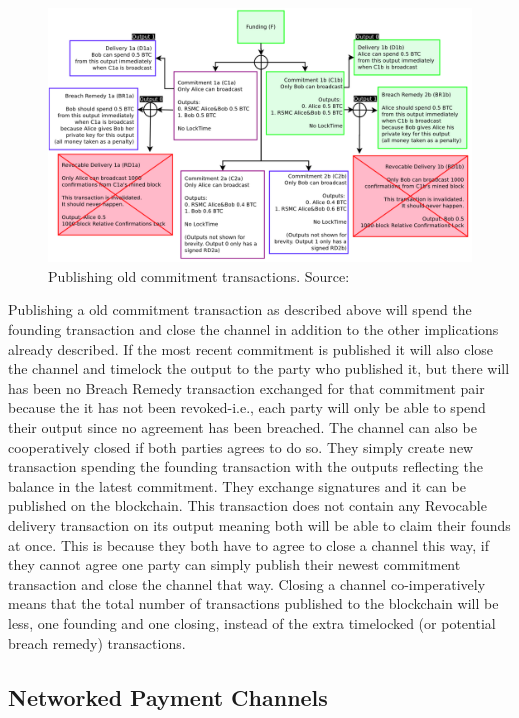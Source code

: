 \begin{figure}[h]
    \centering
    \includegraphics[width=14cm]{figures/ln_breach.png}
    \caption{Publishing old commitment transactions. Source: \cite{poon2015bitcoin}}
    \label{fig:ln_breach}
\end{figure}

Publishing a old commitment transaction as described above will spend the founding transaction and close the channel in addition to the other implications already described. If the most recent commitment is published it will also close the channel and timelock the output to the party who published it, but there will has been no Breach Remedy transaction exchanged for that commitment pair because the it has not been revoked-i.e., each party will only be able to spend their output since no agreement has been breached.
The channel can also be cooperatively closed if both parties agrees to do so. They simply create new transaction spending the founding transaction with the outputs reflecting the balance in the latest commitment. They exchange signatures and it can be published on the blockchain. This transaction does not contain any Revocable delivery transaction on its output meaning both will be able to claim their founds at once. This is because they both have to agree to close a channel this way, if they cannot agree one party can simply publish their newest commitment transaction and close the channel that way.
Closing a channel co-imperatively means that the total number of transactions published to the blockchain will be less, one founding and one closing, instead of the extra timelocked (or potential breach remedy) transactions.

\subsection{Networked Payment Channels}

